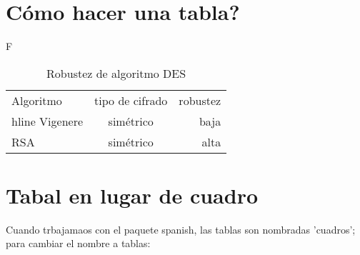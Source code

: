 \documentclass{article}
\begin{document}
\section{Cómo hacer una tabla?}
\begin{table}

F\centering
\label{tab: DESrobustez}
\caption{Robustez de algoritmo DES}
\begin{tabular}{l c r}
Algoritmo & tipo de cifrado & robustez \\hline
Vigenere & simétrico & baja \\
RSA & simétrico & alta \\
\end{tabular}

\end{table}

\section{Tabal en lugar de cuadro}
Cuando trbajamaos con el paquete spanish, las tablas son nombradas 'cuadros'; para cambiar el nombre a tablas:\\
\usepackage[spanish, es-tabla]{babel}
\end{document}
